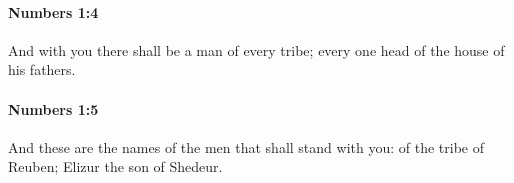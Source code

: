 		\paragraph{Numbers 1:4} %
			\label{NUMBERS-1-4}

			And with you there shall be a man of every tribe; every one head of the house of his fathers.


		\paragraph{Numbers 1:5} %
			\label{NUMBERS-1-5}

			And these are the names of the men that shall stand with you: of the tribe of Reuben; Elizur the son of Shedeur.


